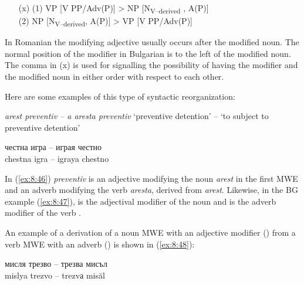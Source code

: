 \documentclass[output=paper]{langsci/langscibook}
\begin{document}
\renewcommand{\theenumi}{(\roman{enumi})}%
\begin{enumerate}
 \setcounter{enumi}{9}
\item[(x)] (1) VP [V PP/Adv(P)] > NP [N\textsubscript{V–derived }, A(P)] \\
(2) NP [N\textsubscript{V–derived}, A(P)] > VP [V PP/Adv(P)]
\end{enumerate}


In Romanian the modifying adjective usually occurs after the modified
noun. The normal position of the modifier in Bulgarian is to the left
of the modified noun. The comma in (x) is used for signalling the
possibility of having the modifier and the modified noun in either
order with respect to each other.



Here are some examples of this type of syntactic reorganization: 



\begin{exe}
\ex \label{ex:8:46}
\settowidth{}
\textit{arest preventiv -- a aresta preventiv} 
‘preventive detention’ -- ‘to subject to preventive detention’
\end{exe}

\begin{exe}
\ex \label{ex:8:47}
\settowidth{}
\gll честна игра -- играя честно\\
chestna igra  -- igraya chestno\\ 
\end{exe}


In (\ref{ex:8:46}) \textit{preventiv} is an adjective modifying the noun \textit{arest} in the
first MWE and an adverb modifying the verb \textit{aresta}, derived from
\textit{arest}. Likewise, in the BG example (\ref{ex:8:47}), 
 is the adjectival
modifier of the noun 
 and 
 is the adverb modifier of the verb
. 



An example of a derivation of a noun MWE with an adjective modifier
() from a verb MWE with an adverb () is shown in (\ref{ex:8:48}):


\begin{exe}
\ex \label{ex:8:48}
\settowidth{}
  \gll мисля трезво -- трезва мисъл\\
  mislya trezvo -- trezvа misăl\\ 
\end{exe}
\end{document}
